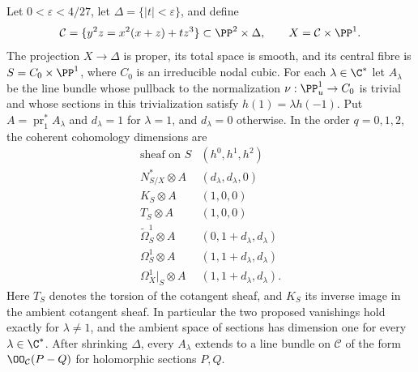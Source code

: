 \begin{proposition}\label{cdp:st:B1}
\label{wbII:thm:nodal-test}\label{wbII:prop:family-geometry}\label{wbII:prop:nodal-counterexample}
Let $0<\varepsilon<4/27$, let $\Delta=\{|t|<\varepsilon\}$, and define
\[
 \mathcal C=\{y^2z=x^2(x+z)+tz^3\}\subset\PP^2\times\Delta,
 \qquad X=\mathcal C\times\PP^1.
\]
The projection $X\to\Delta$ is proper, its total space is smooth, and its central fibre is $S=C_0\times\PP^1$, where $C_0$ is an irreducible nodal cubic. For each $\lambda\in\C^*$ let $A_\lambda$ be the line bundle whose pullback to the normalization $\nu:\PP^1_u\to C_0$ is trivial and whose sections in this trivialization satisfy $h(1)=\lambda h(-1)$. Put $A=\operatorname{pr}_1^*A_\lambda$ and $d_\lambda=1$ for $\lambda=1$, and $d_\lambda=0$ otherwise. In the order $q=0,1,2$, the coherent cohomology dimensions are
\[
\begin{array}{c|c}
\text{sheaf on }S & (h^0,h^1,h^2)\\\hline
 N^*_{S/X}\otimes A &(d_\lambda,d_\lambda,0)\\
 K_S\otimes A &(1,0,0)\\
 T_S\otimes A &(1,0,0)\\
 \widetilde\Omega^1_S\otimes A &(0,1+d_\lambda,d_\lambda)\\
 \Omega^1_S\otimes A &(1,1+d_\lambda,d_\lambda)\\
 \Omega^1_X|_S\otimes A &(1,1+d_\lambda,d_\lambda).
\end{array}                                                    \tag{B.1}\label{cdp:eq:B.1}
\]
Here $T_S$ denotes the torsion of the cotangent sheaf, and $K_S$ its inverse image in the ambient cotangent sheaf. In particular the two proposed vanishings hold exactly for $\lambda\ne1$, and the ambient space of sections has dimension one for every $\lambda\in\C^*$. After shrinking $\Delta$, every $A_\lambda$ extends to a line bundle on $\mathcal C$ of the form $\OO_{\mathcal C}(P-Q)$ for holomorphic sections $P,Q$.
\end{proposition}

